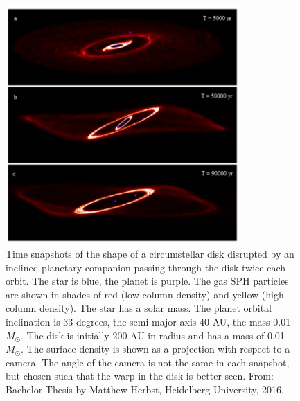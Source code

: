 \documentclass[10pt,fleqn,twoside,a4paper]{article}
\begin{document}
\begin{figure}
\centerline{\includegraphics[width=0.8\textwidth]{D2Fig/Herbst_Fig6-eps-converted-to.pdf}}
\caption{\label{fig-herbst-6}Time snapshots of the shape of a circumstellar
  disk disrupted by an inclined planetary companion passing through the disk
  twice each orbit. The star is blue, the planet is purple. The gas SPH
  particles are shown in shades of red (low column density) and yellow (high
  column density). The star has a solar mass. The planet orbital inclination
  is 33 degrees, the semi-major axis 40 AU, the mass 0.01 $M_{\odot}$. The
  disk is initially 200 AU in radius and has a mass of 0.01 $M_{\odot}$. The
  surface density is shown as a projection with respect to a camera. The
  angle of the camera is not the same in each snapshot, but chosen such that
  the warp in the disk is better seen. From: Bachelor Thesis by Matthew
  Herbst, Heidelberg University, 2016.}
\end{figure}
\end{document}
